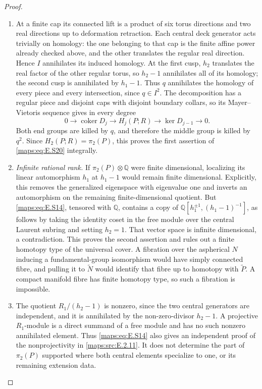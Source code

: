\begin{proof}
\begin{enumerate}[label=\arabic*.,leftmargin=*]
\item At a finite cap its connected lift is a product of six torus
directions and two real directions up to deformation retraction.
Each central deck generator acts trivially on homology: the
one belonging to that cap is the finite affine power already
checked above, and the other translates the regular real
direction. Hence $I$ annihilates its induced homology. At the
first cusp, $h_2$ translates the real factor of the other
regular torus, so $h_2-1$ annihilates all of its homology;
the second cusp is annihilated by $h_1-1$. Thus $q$ annihilates
the homology of every piece and every intersection, since
$q\in I^2$. The decomposition has a regular piece and disjoint
caps with disjoint boundary collars, so its Mayer--Vietoris
sequence gives in every degree
\[
 0\longrightarrow\operatorname{coker}D_j
   \longrightarrow H_j(P;R)
   \longrightarrow\ker D_{j-1}\longrightarrow0.
\]
Both end groups are killed by $q$, and therefore the middle
group is killed by $q^2$. Since $H_2(P;R)=\pi_2(P)$, this
proves the first assertion of \eqref{maps:eq:E.S20} integrally.

\item \emph{Infinite rational rank.}
If $\pi_2(P)\otimes\mathbb Q$ were finite dimensional,
localizing its linear automorphism $h_1$ at $h_1-1$ would
remain finite dimensional. Explicitly, this removes the
generalized eigenspace with eigenvalue one and inverts an
automorphism on the remaining finite-dimensional quotient.
But \eqref{maps:eq:E.S14}, tensored with $\mathbb Q$, contains a copy of
$\mathbb Q[h_1^{\pm1},(h_1-1)^{-1}]$, as follows by taking
the identity coset in the free module over the central
Laurent subring and setting $h_2=1$. That vector space is
infinite dimensional, a contradiction. This proves the
second assertion and rules out a finite homotopy type of
the universal cover. A fibration over the aspherical $N$
inducing a fundamental-group isomorphism would have simply
connected fibre, and pulling it to $\widetilde N$ would
identify that fibre up to homotopy with $\widetilde P$.
A compact manifold fibre has finite homotopy type, so such
a fibration is impossible.

\item The quotient $R_1/(h_2-1)$ is nonzero, since the two central
generators are independent, and it is annihilated by the
non-zero-divisor $h_2-1$. A projective $R_1$-module is a
direct summand of a free module and has no such nonzero
annihilated element. Thus \eqref{maps:eq:E.S14} also gives an independent
proof of the nonprojectivity in \ref{maps:src:E.2.11}. It does not determine
the part of $\pi_2(P)$ supported where both central
elements specialize to one, or its remaining extension data.
\end{enumerate}
\end{proof}

